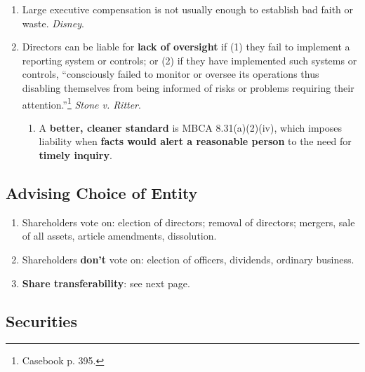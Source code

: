 \begin{enumerate}
\begin{enumerate}
        \item Large executive compensation is not usually enough to establish 
        bad faith or waste. \emph{Disney}.
        \item Directors can be liable for \textbf{lack of oversight} if (1) 
        they fail to implement a reporting system or controls; or (2) if they 
        have implemented such systems or controls, ``consciously failed to 
        monitor or oversee its operations thus disabling themselves from being 
        informed of risks or problems requiring their 
        attention.''\footnote{Casebook p. 395.} \emph{Stone v. Ritter}.
        \begin{enumerate}
            \item A \textbf{better, cleaner standard} is MBCA 8.31(a)(2)(iv), 
            which imposes liability when \textbf{facts would alert a 
            reasonable person} to the need for \textbf{timely inquiry}.
        \end{enumerate}
    \end{enumerate}
\end{enumerate}




\newpage

\subsection{Advising Choice of Entity}

\begin{enumerate}
    \item Shareholders vote on: election of directors; removal of directors; 
    mergers, sale of all assets, article amendments, dissolution.
    \item Shareholders \textbf{don't} vote on: election of officers, 
    dividends, ordinary business.
    \item \textbf{Share transferability}: see next page.
\end{enumerate}




\newpage

\subsection{Securities}

